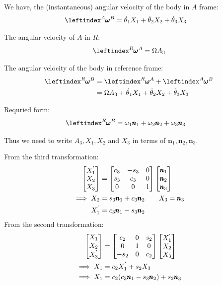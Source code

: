 We have, the (instantaneous) angular velocity of the body in $A$ frame:
\begin{align*}
    \lx{^A}{\pmb \omega}^B &= \dot \theta_1 X_1 + \dot \theta_2 X_2 + \dot \theta_3 X_3
\end{align*}

The angular velocity of $A$ in $R$:
$$ \lx{^R}{\pmb \omega}^A = \Omega A_3$$

The angular velocity of the body in reference frame:
\begin{align*}
    \lx{^R}{\pmb \omega}^B &= \lx{^R}{\pmb \omega}^A + \lx{^A}{\pmb \omega}^B\\
        &= \Omega A_3 +\dot \theta_1 X_1 + \dot \theta_2 X_2 + \dot \theta_3 X_3
\end{align*}

Requried form:
\begin{align*}
    \lx{^R}{\pmb \omega}^B &= \omega_1 \pmb n_1 + \omega_2 \pmb n_2 + \omega_3 \pmb n_3
\end{align*}

Thus we need to write $A_3, X_1, X_2$ and $X_3$ in terms of $\pmb n_1, \pmb n_2, \pmb n_3$.

\begin{multicols}{2}
From the third transformation:
\begin{align*}
    \begin{bmatrix} X_1^{'}\\ X_2\\ X_3 \end{bmatrix} &=
                    \begin{bmatrix} c_3 & -s_3 & 0\\
                        s_3 & c_3 & 0\\
                        0 & 0 & 1 \end{bmatrix}
    \begin{bmatrix} \pmb n_1 \\ \pmb n_2 \\ \pmb n_3 \end{bmatrix}\\
    \implies X_2 &= s_3 \pmb n_1 + c_3 \pmb n_2 \qquad X_3 = \pmb n_3\\
         X_1^{'} &= c_3 \pmb n_1 - s_3 \pmb n_2
\end{align*}
From the second transformation:
\begin{align*}
    \begin{bmatrix} X_1\\ X_2\\ X_3^{'} \end{bmatrix} &=
        \begin{bmatrix} c_2 & 0 & s_2\\
            0 & 1 & 0\\
            -s_2 & 0 & c_2 \end{bmatrix}
    \begin{bmatrix} X_1^{'}\\ X_2\\ X_3 \end{bmatrix}\\
    \implies X_1 &= c_2 X_1^{'} + s_2 X_3\\
    \implies X_1 &= c_2(c_3 \pmb n_1 - s_3 \pmb n_2) + s_2 \pmb n_3
\end{align*}
\end{multicols}

